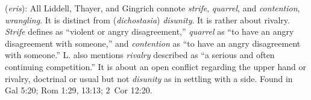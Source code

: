 \item[Quarrel,]

(\textit{eris}):
All Liddell, Thayer, and Gingrich connote \emph{strife}, \emph{quarrel}, and \emph{contention}, \emph{wrangling}.
It is distinct from  (\emph{dichostasia}) \emph{disunity}.
It is rather about rivalry. \emph{Strife} defines as ``violent or angry disagreement,'' \emph{quarrel} as ``to have an angry disagreement with someone,'' and \emph{contention} as ``to have an angry disagreement with someone.'' L. also mentions \emph{rivalry} described as ``a serious and often continuing competition.'' It is about an open conflict regarding the upper hand or rivalry, doctrinal or usual but not \emph{disunity} as in settling with a side.
Found in Gal 5:20; Rom 1:29, 13:13; 2~Cor 12:20.
